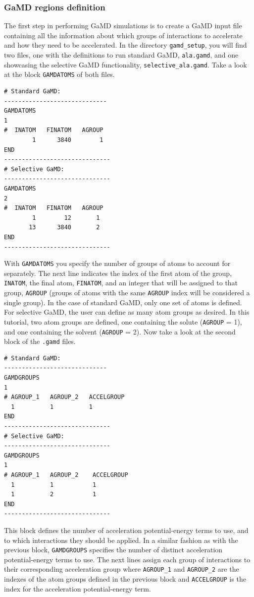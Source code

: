 \subsubsection{GaMD regions definition}
The first step in performing GaMD simulations is to create a GaMD input file containing all the information about which groups of interactions to accelerate and how they need to be accelerated. 
In the directory \texttt{gamd\_setup}, you will find two files, one with the definitions to run standard GaMD, \texttt{ala.gamd}, and one showcasing the selective GaMD functionality, \texttt{selective\_ala.gamd}. Take a look at the block \texttt{GAMDATOMS} of both files.
\begin{lstlisting}
# Standard GaMD:
-----------------------------
GAMDATOMS
1
#  INATOM   FINATOM   AGROUP      
        1      3840        1
END
------------------------------
# Selective GaMD:
------------------------------
GAMDATOMS
2
#  INATOM   FINATOM   AGROUP      
        1        12       1
       13      3840       2
END
------------------------------
\end{lstlisting}
With \texttt{GAMDATOMS} you specify the number of groups of atoms to account for separately. The next line indicates the index of the first atom of the group, \texttt{INATOM}, the final atom, \texttt{FINATOM}, and an integer that will be assigned to that group, \texttt{AGROUP} (groups of atoms with the same \texttt{AGROUP} index will be considered a single group). In the case of standard GaMD, only one set of atoms is defined. For selective GaMD, the user can define as many atom groups as desired. In this tutorial, two atom groups are defined, one containing the solute (\texttt{AGROUP} = 1), and one containing the solvent (\texttt{AGROUP} = 2).
Now take a look at the second block of the \texttt{.gamd} files.
\begin{lstlisting}
# Standard GaMD:
-----------------------------
GAMDGROUPS
1
# AGROUP_1   AGROUP_2   ACCELGROUP
  1          1          1
END
------------------------------
# Selective GaMD:
------------------------------
GAMDGROUPS
1
# AGROUP_1   AGROUP_2    ACCELGROUP
  1          1           1
  1          2           1
END
------------------------------
\end{lstlisting}
This block defines the number of acceleration potential-energy terms to use, and to which interactions they should be applied.
In a similar fashion as with the previous block, \texttt{GAMDGROUPS} specifies the number of distinct acceleration potential-energy terms to use. 
The next lines assign each group of interactions to their corresponding acceleration group where \texttt{AGROUP\_1} and \texttt{AGROUP\_2}  are the indexes of the atom groups defined in the previous block and \texttt{ACCELGROUP} is the index for the acceleration potential-energy term. 
